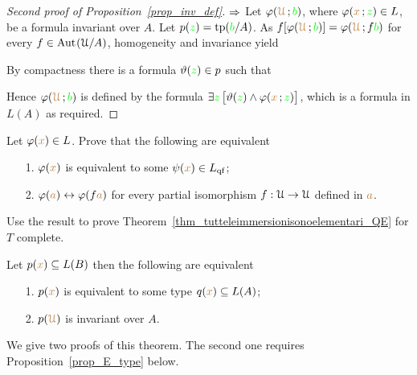 \documentclass[creche.tex]{subfiles}
\begin{document}
\begin{proof}[Second proof of Proposition~\ref{prop_inv_def}] $\Rightarrow$ Let $\varphi({\color{brown}\EuScript U}\,;{\color{green} b})$, where $\varphi({\color{brown} x}\,;{\color{green} z})\in L$, be a formula invariant over $A$. Let $p({\color{green} z})={\rm tp}({\color{green} b}/A)$. As $f[\varphi({\color{brown}\EuScript U}\,;{\color{green} b})]=\varphi({\color{brown}\EuScript U}\,;f{\color{green} b})$  for every $f\in\textrm{Aut\kern.15ex}(\EuScript U/A)$, homogeneity and invariance yield


By compactness there is a formula $\vartheta({\color{green} z})\in p$ such that 


Hence  $\varphi({\color{brown}\EuScript U}\,;{\color{green} b})$ is defined by the formula $\exists {\color{green}z}\,\big[\vartheta({\color{green} z})\wedge\varphi({\color{brown} x}\,;{\color{green} z})\big]$, which is a formula in $L(A)$ as required.
\end{proof}

\begin{exercise}\label{ex_qe_in_U}
Let $\varphi({\color{brown} x})\in L$. Prove that the following are equivalent
\begin{itemize}
 \item[1.] $\varphi({\color{brown} x})$ is equivalent to some $\psi({\color{brown} x})\in L_{\rm qf}$;
 \item[2.] $\varphi({\color{brown} a})\leftrightarrow \varphi(f{\color{brown} a})$ for every partial isomorphism $f:\EuScript U\to\EuScript U$ defined in ${\color{brown} a}$.
\end{itemize}
Use the result to prove Theorem~\ref{thm_tutteleimmersionisonoelementari_QE} for $T$ complete.\QED
\end{exercise}


\begin{proposition}\label{prop_inv_types}
Let $p({\color{brown} x})\subseteq L(B)$ then the following are equivalent
\begin{itemize}
 \item[1.] $p({\color{brown} x})$ is equivalent to some type $q({\color{brown} x})\subseteq L(A)$;
 \item[2.] $p({\color{brown}\EuScript U})$ is invariant over $A$.
\end{itemize}
\end{proposition}

We give two proofs of this theorem.  The second one requires Proposition~\ref{prop_E_type} below.
\end{document}
